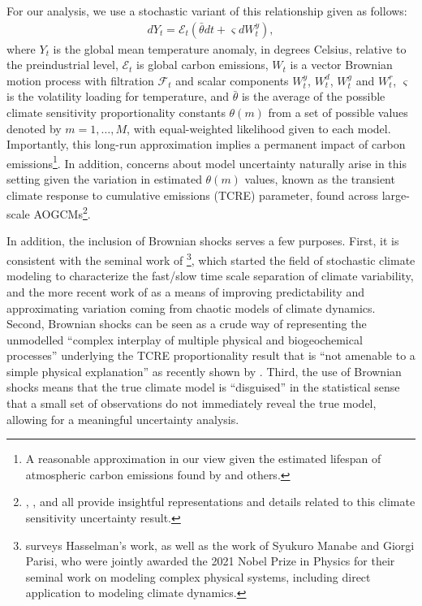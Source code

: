 \documentclass[12pt]{article}
\begin{document}
For our analysis, we use a stochastic variant of this relationship given as follows:
\begin{eqnarray*}
dY_t = \mathcal{E}_t \left( \bar{\theta}  dt + \varsigma dW^{y}_t \right),
\end{eqnarray*}
where $Y_t$ is the global mean temperature anomaly, in degrees Celsius, relative to the preindustrial level, $\mathcal{E}_t$ is global carbon emissions, $W_t$ is a vector Brownian motion process with filtration $\mathcal{F}_t$ and scalar components $W_t^y$, $W_t^d$, $W_t^g$ and $W_t^r$, $\varsigma$ is the volatility loading for temperature, and $\bar{\theta}$ is the average of the possible climate sensitivity proportionality constants $\theta(m)$ from a set of possible values denoted by $m = 1, \ldots, M$, with equal-weighted likelihood given to each model. Importantly, this long-run approximation implies a permanent impact of carbon emissions\footnote{A reasonable approximation in our view given the estimated lifespan of atmospheric carbon emissions found by \cite{Pierrehumbert:2014} and others.}. In addition, concerns about model uncertainty naturally arise in this setting given the variation in estimated $\theta(m)$ values, known as the transient climate response to cumulative emissions (TCRE) parameter, found across large-scale AOGCMs\footnote{\cite{MatthewsGillettScott:2009}, \cite{Friedlingstein:2015}, and \cite{IPCC:2021} all provide insightful representations and details related to this climate sensitivity uncertainty result.}. 

In addition, the inclusion of Brownian shocks serves a few purposes. First, it is consistent with the seminal work of \cite{hasselmann1976stochastic}\footnote{\cite{franzke2022stochastic} surveys Hasselman's work, as well as the work of Syukuro Manabe and Giorgi Parisi, who were jointly awarded the 2021 Nobel Prize in Physics for their seminal work on modeling complex physical systems, including direct application to modeling climate dynamics.}, which started the field of stochastic climate modeling to characterize the fast/slow time scale separation of climate variability, and the more recent work of \cite{PalmerStevens:2019} as a means of improving predictability and approximating variation coming from chaotic models of climate dynamics. Second, Brownian shocks can be seen as a crude way of representing the unmodelled ``complex interplay of multiple physical and biogeochemical processes'' underlying the TCRE proportionality result that is ``not amenable to a simple physical explanation'' as recently shown by \cite{gillett2023warming}. Third, the use of Brownian shocks means that the true climate model is ``disguised'' in the statistical sense that a small set of observations do not immediately reveal the true model, allowing for a meaningful uncertainty analysis. 
\end{document}
